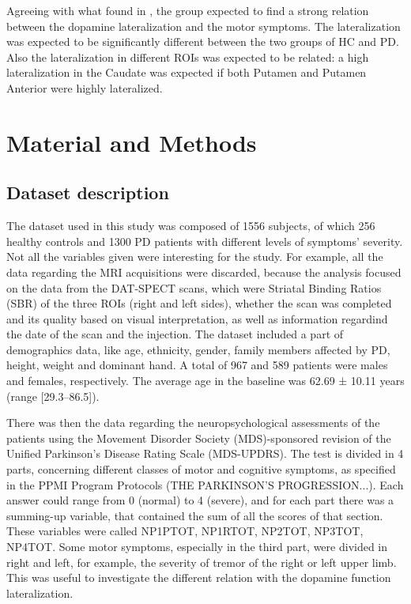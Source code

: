 \documentclass[]{article}
\begin{document}
\begin{multicols}{2}
\newline
Agreeing with what found in \cite{pirker_correlation_2003}, the group expected to find a strong relation between the dopamine lateralization and the motor symptoms. The lateralization was expected to be significantly different between the two groups of HC and PD. Also the lateralization in different ROIs was expected to be related: a high lateralization in the Caudate was expected if both Putamen and Putamen Anterior were highly lateralized. 

\section{Material and Methods}

\subsection{Dataset description}
The dataset used in this study was composed of 1556 subjects, of which 256 healthy controls and 1300 PD patients with different levels of symptoms' severity. Not all the variables given were interesting for the study. For example, all the data regarding the MRI acquisitions were discarded, because the analysis focused on the data from the DAT-SPECT scans, which were Striatal Binding Ratios (SBR) of the three ROIs (right and left sides), whether the scan was completed and its quality based on visual interpretation, as well as information regardind the date of the scan and the injection. 
\newline
The dataset included a part of demographics data, like age, ethnicity, gender, family members affected by PD, height, weight and dominant hand.
A total of 967 and 589 patients were males and females, respectively. The average age in the baseline was 62.69 ± 10.11 years (range [29.3–86.5]). 

There was then the data regarding the neuropsychological assessments of the patients using the Movement Disorder Society (MDS)-sponsored revision of the Unified Parkinson's Disease Rating Scale (MDS-UPDRS). The test is divided in 4 parts, concerning different classes of motor and cognitive symptoms, as specified in the PPMI Program Protocols (THE PARKINSON'S PROGRESSION...). Each answer could range from 0 (normal) to 4 (severe), and for each part there was a summing-up variable, that contained the sum of all the scores of that section. These variables were called NP1PTOT, NP1RTOT, NP2TOT, NP3TOT, NP4TOT. Some motor symptoms, especially in the third part, were divided in right and left, for example, the severity of tremor of the right or left upper limb. This was useful to investigate the different relation with the dopamine function lateralization.
\newline


\end{multicols}
\end{document}
